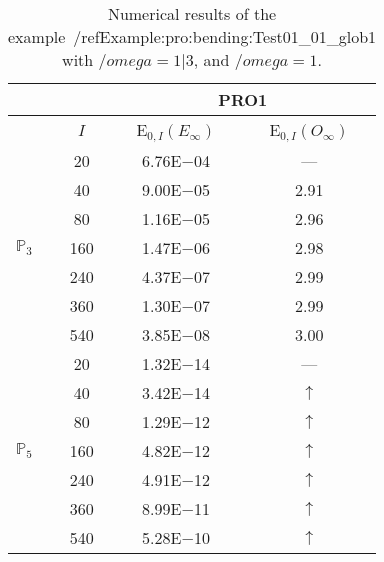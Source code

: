 \begin{table}[H]
\caption{Numerical results of the example~/ref{Example:pro:bending:Test01_01_glob1} with $/omega=1|3$, and $/omega=1$.}
\setlength{\tabcolsep}{5pt}
\centering
\begin{tabular}{@{}l c c c@{}}
\toprule
 &  & \multicolumn{2}{c}{PRO1}\\
\midrule
 & $I$ & E$_{0,I}(E_{\infty})$ & E$_{0,I}(O_{\infty})$\\
\midrule
\multirow{7}{*}{$\mathbb{P}_{3}$}
 & 20 & 6.76E$-$04 & ---\\
 & 40 & 9.00E$-$05 & 2.91\\
 & 80 & 1.16E$-$05 & 2.96\\
 & 160 & 1.47E$-$06 & 2.98\\
 & 240 & 4.37E$-$07 & 2.99\\
 & 360 & 1.30E$-$07 & 2.99\\
 & 540 & 3.85E$-$08 & 3.00\\
\midrule
\multirow{7}{*}{$\mathbb{P}_{5}$}
 & 20 & 1.32E$-$14 & ---\\
 & 40 & 3.42E$-$14 & $\uparrow$\\
 & 80 & 1.29E$-$12 & $\uparrow$\\
 & 160 & 4.82E$-$12 & $\uparrow$\\
 & 240 & 4.91E$-$12 & $\uparrow$\\
 & 360 & 8.99E$-$11 & $\uparrow$\\
 & 540 & 5.28E$-$10 & $\uparrow$\\
\bottomrule
\end{tabular}
\label{Table:pRO:test_01_01_test10_pro3}
\end{table}
